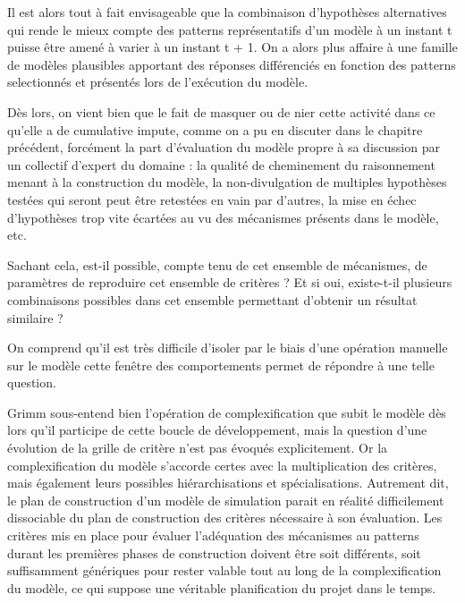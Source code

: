 Il est alors tout à fait envisageable que la combinaison d'hypothèses alternatives qui rende le mieux compte des patterns représentatifs d'un modèle à un instant t puisse être amené à varier à un instant t + 1. On a alors plus affaire à une famille de modèles plausibles apportant des réponses différenciés en fonction des patterns selectionnés et présentés lors de l'exécution du modèle.

Dès lors, on vient bien que le fait de masquer ou de nier cette activité dans ce qu'elle a de cumulative impute, comme on a pu en discuter dans le chapitre précédent, forcément la part d'évaluation du modèle propre à sa discussion par un collectif d'expert du domaine : la qualité de cheminement du raisonnement menant à la construction du modèle, la non-divulgation de multiples hypothèses testées qui seront peut être retestées en vain par d'autres, la mise en échec d'hypothèses trop vite écartées au vu des mécanismes présents dans le modèle, etc.



Sachant cela, est-il possible, compte tenu de cet ensemble de mécanismes, de paramètres de reproduire cet ensemble de critères ? Et si oui, existe-t-il plusieurs combinaisons possibles dans cet ensemble permettant d'obtenir un résultat similaire ?

On comprend qu'il est très difficile d'isoler par le biais d'une opération manuelle sur le modèle cette fenêtre des comportements permet de répondre à une telle question. 

Grimm sous-entend bien l'opération de complexification que subit le modèle dès lors qu'il participe de cette boucle de développement, mais la question d'une évolution de la grille de critère n'est pas évoqués explicitement. Or la complexification du modèle s'accorde certes avec la multiplication des critères, mais également leurs possibles hiérarchisations et spécialisations. Autrement dit, le plan de construction d'un modèle de simulation parait en réalité difficilement dissociable du plan de construction des critères nécessaire à son évaluation. Les critères mis en place pour évaluer l'adéquation des mécanismes au patterns durant les premières phases de construction doivent être soit différents, soit suffisamment génériques pour rester valable tout au long de la complexification du modèle, ce qui suppose une véritable planification du projet dans le temps.

